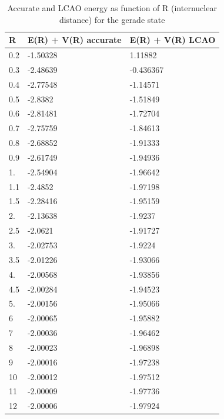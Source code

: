\begin{table}[ht]
  \caption{Accurate and LCAO energy as function of R (internuclear distance) for the gerade state}
  \centering
  \label{tab:lcaotabG}
  \begin{tabular}{ m{4em} m{4em} m{4em} }
    \hline
    R & E(R) + V(R) accurate  &  E(R) + V(R) LCAO \\ \hline \hline
    0.2 & -1.50328 & 1.11882 \\
 0.3 & -2.48639 & -0.436367 \\
 0.4 & -2.77548 & -1.14571 \\
 0.5 & -2.8382 & -1.51849 \\
 0.6 & -2.81481 & -1.72704 \\
 0.7 & -2.75759 & -1.84613 \\
 0.8 & -2.68852  & -1.91333 \\
 0.9 & -2.61749 & -1.94936 \\
 1. & -2.54904 & -1.96642 \\
 1.1 & -2.4852 & -1.97198 \\
 1.5 & -2.28416 & -1.95159 \\
 2. & -2.13638 & -1.9237 \\
 2.5 & -2.0621 & -1.91727 \\
 3. & -2.02753 & -1.9224 \\
 3.5 & -2.01226 & -1.93066 \\
 4. & -2.00568  & -1.93856 \\
 4.5 & -2.00284 & -1.94523 \\
 5. & -2.00156 & -1.95066 \\
 6 & -2.00065 & -1.95882 \\
 7 & -2.00036 & -1.96462 \\
 8 & -2.00023 & -1.96898 \\
 9 & -2.00016 & -1.97238 \\
    10 & -2.00012 &  -1.97512 \\
    11 & -2.00009  & -1.97736 \\
    12 & -2.00006 & -1.97924 \\
  \hline
   \end{tabular}
\label{tableG}
\end{table}

\afterpage{\clearpage}

